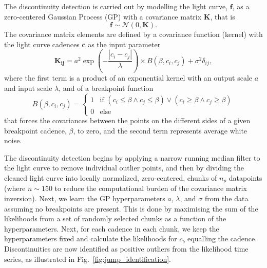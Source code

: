 \documentclass[useAMS,usenatbib]{mn2e}
\begin{document}
The discontinuity detection is carried out by modelling the light curve, $\mathbf{f}$, as 
a zero-centered Gaussian Process (GP) with a covariance matrix $\mathbf{K}$, that is
\begin{equation}
    \mathbf{f} \sim \mathcal{N}(0, \mathbf{K}).
\end{equation}
The covariance matrix elements are defined by a covariance function (kernel) with the light curve cadences $\mathbf{c}$ as the input parameter
\begin{equation}
    \mathbf{K_{ij}} = a^2 \exp\left(-\frac{|c_i - c_j|}{\lambda}\right) \times B(\beta, c_i, c_j) + \sigma^2 \delta_{ij},
\end{equation}
where the first term is a product of an exponential kernel with an output scale $a$ and input scale $\lambda$, and of a breakpoint function 
\begin{equation*}
    B(\beta, c_i, c_j) = \begin{cases}
    1 &\text{if } \left( c_i \leq \beta \land c_j \leq \beta\right) \lor (c_i \geq \beta \land c_j \geq \beta)\\
    0 &\text{else}
    \end{cases}
\end{equation*}
that forces the covariances between the points on the different sides of a given breakpoint cadence, $\beta$, to zero, and the second term represents average white noise.

The discontinuity detection begins by applying a narrow running median filter to the light curve to remove individual outlier points, and then by dividing the cleaned light curve into locally normalized, zero-centered, chunks of $n_p$ datapoints (where $n \sim 150$ to reduce the computational burden of the covariance matrix inversion). Next, we learn the GP hyperparameters $a$, $\lambda$, and $\sigma$ from the data assuming no breakpoints are present. This is done by maximising the sum of the likelihoods from a set of randomly selected chunks as a function of the hyperparameters. Next, for each cadence in  each  chunk, we keep the hyperparameters fixed and calculate the likelihoods for $c_b$ equalling the cadence. Discontinuities are now identified as positive outliers from the likelihood time series, as illustrated  in Fig.~\ref{fig:jump_identification}.
\end{document}

